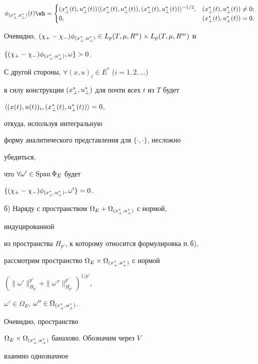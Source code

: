 \begin{pf}
$$ 


\phi_{\myxu{\bot}}(t)\wh = 


\begin{cases} 


(x^*_\bot(t),u^*_\bot(t))\la(x^*_\bot(t),u^*_\bot(t)), 


(x^*_\bot(t),u^*_\bot(t))\ra^{-1/2}, & 


(x^*_\bot(t),u^*_\bot(t))\ne0;\\ 


0, & (x^*_\bot(t),u^*_\bot(t))=0. 


\end{cases} 


$$ 


Очевидно, $(\chi_+-\chi_-)\phi_{\myxu{\bot}}\in 


L_p(T,\mu,R^n)\times L_p(T,\mu,R^m)$ и 


$\{(\chi_+-\chi_-)\phi_{{(x^*_{\bot},u^*_{\bot})}},\omega\}>0$. 


С другой стороны, $\forall(x,u)_i\in E^*$ ($i=1,2,\dotsc$) 


в силу конструкции ${(x^*_{\bot},u^*_{\bot})}$ для почти всех $t$ из $T$ будет 


$\langle(x(t),u(t))_i,(x^*_\bot(t),u^*_\bot(t))\rangle=0$, 


откуда, используя интегральную 


форму аналитического представления для $\{\cdot,\cdot\}$, несложно 


убедиться, 


что $\forall\omega'\in\operatorname{Span}\Phi_E$ будет 


$\{(\chi_+-\chi_-)\phi_{{(x^*_{\bot},u^*_{\bot})}},\omega'\}=0$. 


 


б) Наряду с пространством $\Omega_E+\Omega_{{(x^*_{\bot},u^*_{\bot})}}$ с нормой, 


индуцированной 


из пространства $H_{p'}$, к которому относится формулировка п.\,б), 


рассмотрим пространство $\Omega_E\times\Omega_{{(x^*_{\bot},u^*_{\bot})}}$ с нормой 


$(\|\omega'\|^{p'}_{H_{p'}}+\|\omega''\|^{p'}_{H_{p'}})^{1/p'}$, 


$\omega'\in\Omega_E$, $\omega''\in\Omega_{{(x^*_{\bot},u^*_{\bot})}}$. 


Очевидно, пространство 


$\Omega_E\times\Omega_{{(x^*_{\bot},u^*_{\bot})}}$ банахово. Обозначим через $V$ 


взаимно однозначное 



\end{pf}
